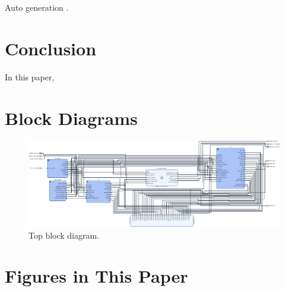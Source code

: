 \documentclass[journal,twoside]{IEEEtran}
\begin{document}
      Auto generation \cite{zhao2023automatic}.

  \section{Conclusion}

    In this paper,


  \appendices

  \section{Block Diagrams}

    \begin{figure}
      \includegraphics[width=\linewidth]{../schematic/top.pdf}
      \caption{Top block diagram.}
    \end{figure}

  \section{Figures in This Paper}

  
  
\end{document}

